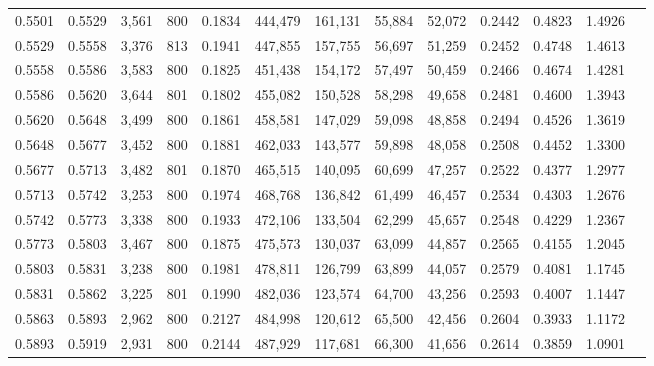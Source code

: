 \begin{tabular}{rrrrrrrrrrrrr}
0.5501 & 0.5529 &  3,561 & 800 &                                     0.1834 & 444,479 & 161,131 &  55,884 &  52,072 & 0.2442 & 0.4823 & 1.4926 \\
0.5529 & 0.5558 &  3,376 & 813 &                                     0.1941 & 447,855 & 157,755 &  56,697 &  51,259 & 0.2452 & 0.4748 & 1.4613 \\
0.5558 & 0.5586 &  3,583 & 800 &                                     0.1825 & 451,438 & 154,172 &  57,497 &  50,459 & 0.2466 & 0.4674 & 1.4281 \\
0.5586 & 0.5620 &  3,644 & 801 &                                     0.1802 & 455,082 & 150,528 &  58,298 &  49,658 & 0.2481 & 0.4600 & 1.3943 \\
0.5620 & 0.5648 &  3,499 & 800 &                                     0.1861 & 458,581 & 147,029 &  59,098 &  48,858 & 0.2494 & 0.4526 & 1.3619 \\
0.5648 & 0.5677 &  3,452 & 800 &                                     0.1881 & 462,033 & 143,577 &  59,898 &  48,058 & 0.2508 & 0.4452 & 1.3300 \\
0.5677 & 0.5713 &  3,482 & 801 &                                     0.1870 & 465,515 & 140,095 &  60,699 &  47,257 & 0.2522 & 0.4377 & 1.2977 \\
0.5713 & 0.5742 &  3,253 & 800 &                                     0.1974 & 468,768 & 136,842 &  61,499 &  46,457 & 0.2534 & 0.4303 & 1.2676 \\
0.5742 & 0.5773 &  3,338 & 800 &                                     0.1933 & 472,106 & 133,504 &  62,299 &  45,657 & 0.2548 & 0.4229 & 1.2367 \\
0.5773 & 0.5803 &  3,467 & 800 &                                     0.1875 & 475,573 & 130,037 &  63,099 &  44,857 & 0.2565 & 0.4155 & 1.2045 \\
0.5803 & 0.5831 &  3,238 & 800 &                                     0.1981 & 478,811 & 126,799 &  63,899 &  44,057 & 0.2579 & 0.4081 & 1.1745 \\
0.5831 & 0.5862 &  3,225 & 801 &                                     0.1990 & 482,036 & 123,574 &  64,700 &  43,256 & 0.2593 & 0.4007 & 1.1447 \\
0.5863 & 0.5893 &  2,962 & 800 &                                     0.2127 & 484,998 & 120,612 &  65,500 &  42,456 & 0.2604 & 0.3933 & 1.1172 \\
0.5893 & 0.5919 &  2,931 & 800 &                                     0.2144 & 487,929 & 117,681 &  66,300 &  41,656 & 0.2614 & 0.3859 & 1.0901 \\

\end{tabular}
